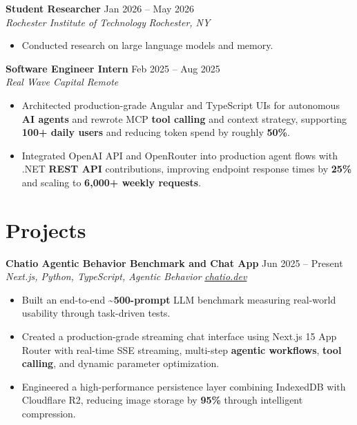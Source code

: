 \documentclass[10pt,letterpaper]{article}
\newif\ifresumeFirstRole
\newcommand{\resumeRole}[4]{%
  \ifresumeFirstRole
    \global\resumeFirstRolefalse
  \else
    \vspace{0pt plus 1fill}%
  \fi
  \textbf{#1} \hfill #2\\
  \textit{#3} \hfill \textit{#4}
}
\begin{document}
\resumeRole{Student Researcher}{Jan 2026 -- May 2026}{Rochester Institute of Technology}{Rochester, NY}
\begin{itemize}
  \item Conducted research on large language models and memory.
\end{itemize}

\resumeRole{Software Engineer Intern}{Feb 2025 -- Aug 2025}{Real Wave Capital}{Remote}
\begin{itemize}
  \item Architected production-grade Angular and TypeScript UIs for autonomous \textbf{AI agents} and rewrote MCP \textbf{tool calling} and context strategy, supporting \textbf{100+ daily users} and reducing token spend by roughly \textbf{50\%}.
  \item Integrated OpenAI API and OpenRouter into production agent flows with .NET \textbf{REST API} contributions, improving endpoint response times by \textbf{25\%} and scaling to \textbf{6,000+ weekly requests}.
\end{itemize}

\section*{Projects}
\resumeRole{Chatio Agentic Behavior Benchmark and Chat App}{Jun 2025 -- Present}{Next.js, Python, TypeScript, Agentic Behavior}{\href{https://chatio.dev}{chatio.dev}}
\begin{itemize}
  \item Built an end-to-end \textbf{\textasciitilde500-prompt} LLM benchmark measuring real-world usability through task-driven tests.
  \item Created a production-grade streaming chat interface using Next.js 15 App Router with real-time SSE streaming, multi-step \textbf{agentic workflows}, \textbf{tool calling}, and dynamic parameter optimization.
  \item Engineered a high-performance persistence layer combining IndexedDB with Cloudflare R2, reducing image storage by \textbf{95\%} through intelligent compression.
\end{itemize}
\end{document}
